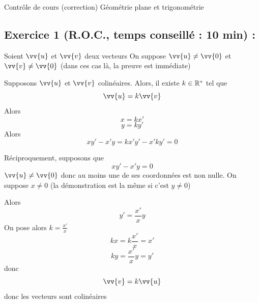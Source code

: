

\usepackage{tcolorbox}
\usepackage[c]{esvect}
\newcommand{\covec}[2]{\begin{pmatrix}#1 \\#2 \end{pmatrix}}



\center
\Large
Contrôle de cours (correction)
\flushleft
\center
Géométrie plane et trigonométrie
\flushleft \normalsize
\subsection*{Exercice 1 (R.O.C., temps conseillé : 10 min) : }
Soient $\vv{u}$ et $\vv{v}$ deux vecteurs 
On suppose $\vv{u} \neq \vv{0}$ et $\vv{v} \neq \vv{0}$ (dans ces cas là, la preuve est immédiate)\newline

Supposons $\vv{u}$ et $\vv{v}$ colinéaires. Alors, il existe $k\in \mathbb{R}^*$ tel que $$\vv{u} = k\vv{v}$$
Alors 
$$x = kx'$$
$$y = ky'$$
Alors $$xy' - x'y = kx'y' - x'ky' = 0$$

Réciproquement, supposons que $$xy'-x'y = 0$$
$\vv{u} \neq \vv{0}$ donc au moins une de ses coordonnées est non nulle. On suppose $x \neq 0$ (la démonstration est la même si c'est $y\neq 0$)\newline

Alors $$y' = \frac{x'}{x}y$$
On pose alors $k = \frac{x'}{x}$ 
$$kx = k\frac{x'}{x} = x'$$
$$ky = \frac{x'}{x} y = y'$$
donc 
$$\vv{v} = k\vv{u}$$ 
donc les vecteurs sont colinéaires

